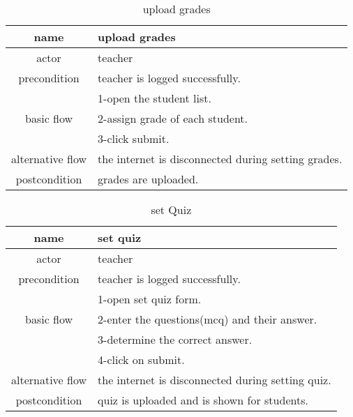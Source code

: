 \documentclass{article}
\begin{document}
    \begin{table}
    	\centering
    	\caption{upload grades}
    	\label{upload grades}
    	\begin{tabular}{|c|l|}
    		\hline
    		name & upload grades\\
    		\hline
    		actor & teacher\\
    		\hline
    		precondition & teacher is logged successfully.\\
    		\hline
    		           &1-open the student list.\\
    		basic flow & 2-assign grade of each student.\\
    		           &3-click submit.\\
    		\hline
    		alternative flow & the internet is disconnected during setting grades.\\
    		\hline
    		postcondition & grades are uploaded.\\
    		\hline
    	\end{tabular}
    \end{table}
    
    \begin{table}
    	\centering
    	\label{set Quiz}
    	\caption{set Quiz}
    	\begin{tabular}{|c|l|}
    		\hline
    		name & set quiz\\
    		\hline
    		actor & teacher\\ 
    		\hline
    		precondition & teacher is logged successfully.\\
    		\hline
		    		& 1-open set quiz form.\\
		basic flow  &2-enter the questions(mcq) and their answer.\\
		    		&3-determine the correct answer.\\
			    		&4-click on submit.\\
			    		\hline
    		alternative flow &the internet is disconnected during setting quiz.\\
    		\hline
    		postcondition & quiz is uploaded and is shown for students.\\
    		\hline
    	\end{tabular}
    \end{table}
    
\end{document}
